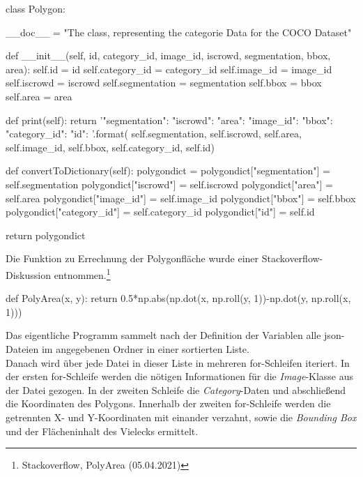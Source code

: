 \documentclass[a4paper,12pt,ngerman]{article}
\begin{document}
\begin{python}
class Polygon:
    
    __doc__ = "The class, representing the categorie Data for the COCO Dataset"

    def __init__(self, id, category_id, image_id, iscrowd, segmentation, bbox, area):
        self.id = id
        self.category_id = category_id
        self.image_id = image_id
        self.iscrowd = iscrowd
        self.segmentation = segmentation
        self.bbox = bbox
        self.area = area

    def print(self):
        return '"segmentation": {}\n"iscrowd": {}\n"area": {}\n"image_id": {}\n"bbox": {}\n"category_id": {}\n"id": {}\n'.format(
            self.segmentation,
            self.iscrowd,
            self.area,
            self.image_id,
            self.bbox,
            self.category_id,
            self.id)

    def convertToDictionary(self):
        polygondict = {}
        polygondict["segmentation"] = self.segmentation
        polygondict["iscrowd"] = self.iscrowd
        polygondict["area"] = self.area
        polygondict["image_id"] = self.image_id
        polygondict["bbox"] = self.bbox
        polygondict["category_id"] = self.category_id
        polygondict["id"] = self.id

        return polygondict
\end{python}

Die Funktion zu Errechnung der Polygonfläche wurde einer Stackoverflow-Diskussion entnommen.\footnote{Stackoverflow, PolyArea (05.04.2021)} \\

\begin{python}
def PolyArea(x, y):
    return 0.5*np.abs(np.dot(x, np.roll(y, 1))-np.dot(y, np.roll(x, 1)))
\end{python}

Das eigentliche Programm sammelt nach der Definition der Variablen alle json-Dateien im angegebenen Ordner in einer sortierten Liste. \\
Danach wird über jede Datei in dieser Liste in mehreren for-Schleifen iteriert. In der ersten for-Schleife werden die nötigen Informationen für die \textit{Image}-Klasse aus der Datei gezogen. In der zweiten Schleife die \textit{Category}-Daten und abschließend die Koordinaten des Polygons. Innerhalb der zweiten for-Schleife werden die getrennten X- und Y-Koordinaten mit einander verzahnt, sowie die \textit{Bounding Box} und der Flächeninhalt des Vielecks ermittelt.
\end{document}
